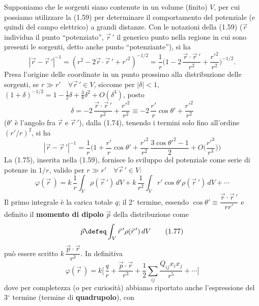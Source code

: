 Supponiamo che le sorgenti siano contenute in un volume (finito) $V$, per cui
possiamo utilizzare la (1.59) per determinare il comportamento del potenziale (e
quindi del campo elettrico) a grandi distanze. Con le notazioni della (1.59)
($\vec r$ individua il punto ``potenziato'', $\vec r\,'$ il generico punto nella
regione in cui sono presenti le sorgenti, detto anche punto ``potenziante''), si
ha
\begin{equation}
  |\vec r-\vec r\,'|^{-1}=(r^2-2\vec r\cdot\vec r\,'+r'^2)^{-1/2}
  =\frac1r\Big(1-2\,\frac{\vec r\cdot\vec r\,'}{r^2}
  +\frac{r'^2}{r^2}\Big)^{-1/2}.
  \tag{1.74}
\end{equation}
Presa l'origine delle coordinate in un punto prossimo alla distribuzione delle
sorgenti, se $r\gg r'\quad\forall\vec r\,'\in V$, siccome per $|\delta|<1$,
\ $(1+\delta)^{-1/2}=1-\frac12\delta+\frac38\delta^2+O(\delta^3)$, posto
\[
  \delta=-2\,\frac{\vec r\cdot\vec r\,'}{r^2}+\frac{r'^2}{r^2}
  \equiv-2\,\frac{r'}{r}\cos\theta'+\frac{r'^2}{r^2}
\]
($\theta'$ \`e l'angolo fra $\vec r$ e $\vec r\,'$), dalla (1.74), tenendo i
termini solo fino all'ordine $(r'/r)^2$, si ha
\begin{equation}
  |\vec r-\vec r\,'|^{-1}=\frac1r\Big(1+\frac{r'}{r}\cos\theta'
  +\frac{r'^2}{r^2}\,\frac{3\cos\theta'^2-1}{2}+O\big(\frac{r'^3}{r^3}\big)\Big)
  \tag{1.75}
\end{equation}
La (1.75), inserita nella (1.59), fornisce lo sviluppo del potenziale come serie
di potenze in $1/r$, valido per $r\gg r'\quad\forall\vec r\,'\in V$:
\begin{equation}
  \varphi(\vec r\,)=k\,\frac1r\int_V\rho(\vec r\,')\,dV
  +k\,\frac{1}{r^2}\int_Vr'\cos\theta'\rho(\vec r\,')\,dV+\cdots
  \tag{1.76}
\end{equation}
Il primo integrale \`e la carica totale $q$; il 2$^\circ$ termine, essendo
$\cos\theta'\equiv\dfrac{\vec r\cdot\vec r\,'}{rr'}$ e definito il
\textbf{momento di dipolo} $\vec p$ della distribuzione come
\begin{equation}
  \vec p\defeq\int_V\vec r\,'\rho(\vec r\,')\,dV
  \tag{1.77}
\end{equation}
pu\`o essere scritto $k\,\dfrac{\vec p\cdot\vec r}{r^3}$. In definitiva
\begin{equation}
  \varphi(\vec r\,)=k\Big[\,\frac qr+\frac{\vec p\cdot\vec r}{r^3}
  +\frac12\sum_{ij}\frac{Q_{ij}x_ix_j}{r^5}+\cdots\Big]
  \tag{1.78}
\end{equation}
dove per completezza (o per curiosit\`a) abbiamo riportato anche l'espressione
del 3$^\circ$ termine (termine di \textbf{quadrupolo}), con

